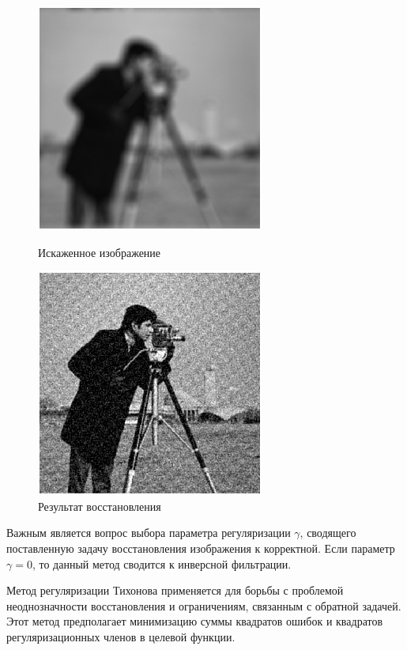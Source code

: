 \begin{figure}[!htb]
	\begin{minipage}{0.48\textwidth}
		\centering
		\includegraphics[scale=0.91]{assets/cameramen_reg_before}
		\caption{Искаженное изображение}\label{Fig:reg_1}
	\end{minipage}\hfill
	\begin{minipage}{0.48\textwidth}
		\centering
		\includegraphics[scale=0.9]{assets/cameramen_reg}
		\caption{Результат восстановления}\label{Fig:reg_2}
	\end{minipage}
\end{figure}

Важным является вопрос выбора параметра регуляризации $\gamma$, сводящего поставленную задачу восстановления изображения к корректной. Если параметр $\gamma = 0$, то данный метод сводится к инверсной фильтрации.

Метод регуляризации Тихонова применяется для борьбы с проблемой неоднозначности восстановления и ограничениям, связанным с обратной задачей. Этот метод предполагает минимизацию суммы квадратов ошибок и квадратов регуляризационных членов в целевой функции.

